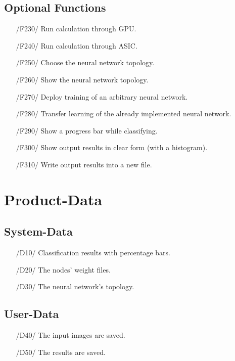 \documentclass[parskip=full]{scrartcl}
\begin{document}
\subsection{Optional Functions} \label {ofunc}

\begin{itemize}
	\item[/F230/] Run calculation through GPU.
	\item[/F240/] Run calculation through ASIC.
	\item[/F250/] Choose the neural network topology.
	\item[/F260/] Show the neural network topology.
	\item[/F270/] Deploy training of an arbitrary neural network.
	\item[/F280/] Transfer learning of the already implemented neural network.
	\item[/F290/] Show a progress bar while classifying.
	\item[/F300/] Show output results in clear form (with a histogram).
	\item[/F310/] Write output results into a new file.
\end{itemize}

\pagebreak





\section{Product-Data}

\subsection{System-Data}

\begin{itemize}
	\item[/D10/] Classification results with percentage bars.
	\item[/D20/] The nodes' weight files.
	\item[/D30/] The neural network's topology.
\end{itemize}

\subsection{User-Data}

\begin{itemize}
	\item[/D40/] The input images are saved.
	\item[/D50/] The results are saved.
\end{itemize}
\end{document}
